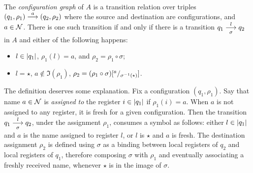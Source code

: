 \begin{definition}
 The \emph{configuration graph} of $A$ is a transition relation over triples $(q_1,\rho_1) \overset{a}{\longrightarrow} (q_2,\rho_2)$ where the source and destination are configurations, and $a \in \mathcal{N}$. There is one such transition if and only if there is a transition $q_1 \overset{l}{\underset{\sigma}{\longrightarrow}} q_2$ in $A$ and either of the following happens: 
 \begin{itemize} 
  \item $l \in |q_1|$, $\rho_1(l) = a$, and $\rho_2 = \rho_1 \circ \sigma$;
  \item $l = \star$, $a \notin \Im(\rho_1)$, $\rho_2 = (\rho_1 \circ \sigma)[{}^{a}/_{\sigma^{-1}(\star)}]$.
 \end{itemize}
\end{definition}
% 
The definition deserves some explanation. Fix a configuration $(q_1,\rho_1)$. Say that name $a\in \mathcal{N}$ is \emph{assigned to} the register $i \in |q_1|$ if $\rho_1(i) = a$. When $a$ is not assigned to any register, it is fresh for a given configuration. Then the transition $q_1 \overset{l}{\underset{\sigma}{\longrightarrow}} q_2$, under the assignment $\rho_1$, consumes a symbol as follows: either $l \in |q_1|$ and $a$ is the name assigned to register $l$, or $l$ is $\star$ and $a$ is fresh. The destination assignment $\rho_2$ is defined using $\sigma$ as a binding between local registers of $q_2$ and local registers of $q_1$, therefore composing $\sigma$ with $\rho_1$ and eventually associating a freshly received name, whenever $\star$ is in the image of $\sigma$.

% 
